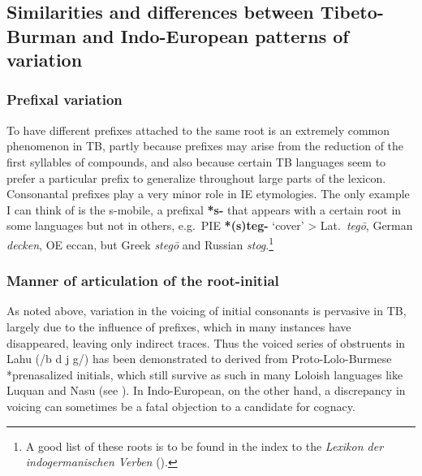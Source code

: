 \subsection{Similarities and differences between Tibeto-Burman and Indo-European patterns of variation}

\subsubsection{Prefixal variation}

To have different prefixes attached to the same root is an extremely common phenomenon in TB, 
partly because prefixes may arise from the reduction of the first syllables of compounds, and also because certain TB languages seem to prefer a particular prefix to generalize throughout large parts of the lexicon.  Consonantal prefixes play a very minor role in IE etymologies. The only example I can think of is the s-mobile, a prefixal \textbf{*s-} that appears with a certain root in some languages but not in others, e.g.\ PIE \textbf{*(s)teg-} ‘cover’ > Lat.\ \textit{tegō}, German \textit{decken}, OE {{\th}eccan}, but Greek \textit{stegō} and Russian \textit{stog}.\footnote{A good list of these roots is to be found in the index to the \textit{Lexikon der indogermanischen Verben} (\citealt{HRMK-LIV}).}

\subsubsection{Manner of articulation of the root-initial}

As noted above, variation in the voicing of initial consonants is pervasive in TB, largely due to the influence of prefixes, which in many instances have disappeared, leaving only indirect traces. Thus the voiced series of obstruents in Lahu (/b d j g/) has been demonstrated to derived from Proto-Lolo-Burmese *prenasalized initials, which still survive as such in many Loloish languages like Luquan and Nasu (see \citealt{JAM-TSR}).
In Indo-European, on the other hand, a discrepancy in voicing can sometimes be a fatal objection to a candidate for cognacy.



